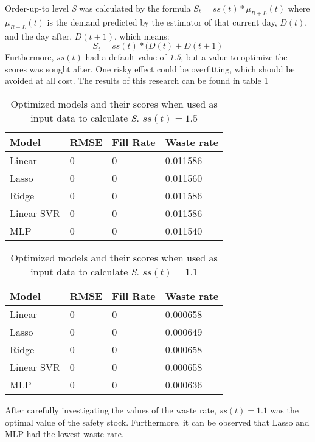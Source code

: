 \documentclass[final,authoryear,5p,times,twocolumn, 11pt]{elsarticle}
\begin{document}
Order-up-to level \textit{S} was calculated by the formula $S_{t} = ss(t)*\mu_{R+L}(t)$ where $\mu_{R+L}(t)$ is the demand predicted by the estimator of that current day, $D(t)$, and the day after, $D(t+1)$, which means:
\begin{equation}
S_{t} = ss(t)*(D(t)+D(t+1)
\end{equation}
Furthermore, $ss(t)$ had a default value of \textit{1.5}, but a value to optimize the scores was sought after. One risky effect could be overfitting, which should be avoided at all cost. The results of this research can be found in table \ref{tab:quantitative}
\begin{table}[!h]
	\begin{tabular}{>{\raggedright}p{}p{}p{}p{}}
		\hline
		Model                & RMSE & Fill Rate & Waste rate \\ \hline
		Linear    & 0    & 0         & 0.011586   \\
		Lasso     & 0    & 0         & 0.011560   \\
		Ridge     & 0    & 0         & 0.011586   \\
		Linear SVR & 0    & 0         & 0.011586   \\
		MLP       & 0    & 0         & 0.011540   \\ \hline
	\end{tabular}
\caption{Optimized models and their scores when used as input data to calculate \textit{S}. $ss(t)=1.5$}
\label{tab:quantitative}
\end{table}

\begin{table}[!h]
	\begin{tabular}{>{\raggedright}p{}p{}p{}p{}}
		\hline
		Model                & RMSE & Fill Rate & Waste rate \\ \hline
		Linear    & 0    & 0         & 0.000658   \\
		Lasso     & 0    & 0         & 0.000649   \\
		Ridge     & 0    & 0         & 0.000658   \\
		Linear SVR & 0    & 0         & 0.000658   \\
		MLP       & 0    & 0         & 0.000636   \\ \hline
	\end{tabular}
	\caption{Optimized models and their scores when used as input data to calculate \textit{S}. $ss(t)=1.1$}
	\label{tab:quantitative1}
\end{table}
\newpage
After carefully investigating the values of the waste rate, $ss(t)=1.1$ was the optimal value of the safety stock. Furthermore, it can be observed that Lasso and MLP had the lowest waste rate.
\end{document}
